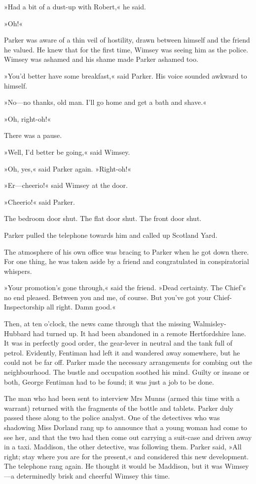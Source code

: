 »Had a bit of a dust-up with Robert,« he said.

»Oh!«

Parker was aware of a thin veil of hostility, drawn between himself and the friend he valued. He knew that for the first time, Wimsey was seeing him as the police. Wimsey was ashamed and his shame made Parker ashamed too.

»You'd better have some breakfast,« said Parker. His voice sounded awkward to himself.

»No\allowbreak---\allowbreak no thanks, old man. I'll go home and get a bath and shave.«

»Oh, right-oh!«

There was a pause.

»Well, I'd better be going,« said Wimsey.

»Oh, yes,« said Parker again. »Right-oh!«

»Er\allowbreak---\allowbreak cheerio!« said Wimsey at the door.

»Cheerio!« said Parker.

The bedroom door shut. The flat door shut. The front door shut.

Parker pulled the telephone towards him and called up Scotland Yard.

The atmosphere of his own office was bracing to Parker when he got down there. For one thing, he was taken aside by a friend and congratulated in conspiratorial whispers.

»Your promotion's gone through,« said the friend. »Dead certainty. The Chief's no end pleased. Between you and me, of course. But you've got your Chief-Inspectorship all right. Damn good.«

Then, at ten o'clock, the news came through that the missing Walmisley-Hubbard had turned up. It had been abandoned in a remote Hertfordshire lane. It was in perfectly good order, the gear-lever in neutral and the tank full of petrol. Evidently, Fentiman had left it and wandered away somewhere, but he could not be far off. Parker made the necessary arrangements for combing out the neighbourhood. The bustle and occupation soothed his mind. Guilty or insane or both, George Fentiman had to be found; it was just a job to be done.

The man who had been sent to interview Mrs Munns (armed this time with a warrant) returned with the fragments of the bottle and tablets. Parker duly passed these along to the police analyst. One of the detectives who was shadowing Miss Dorland rang up to announce that a young woman had come to see her, and that the two had then come out carrying a suit-case and driven away in a taxi. Maddison, the other detective, was following them. Parker said, »All right; stay where you are for the present,« and considered this new development. The telephone rang again. He thought it would be Maddison, but it was Wimsey\allowbreak---\allowbreak a determinedly brisk and cheerful Wimsey this time.

